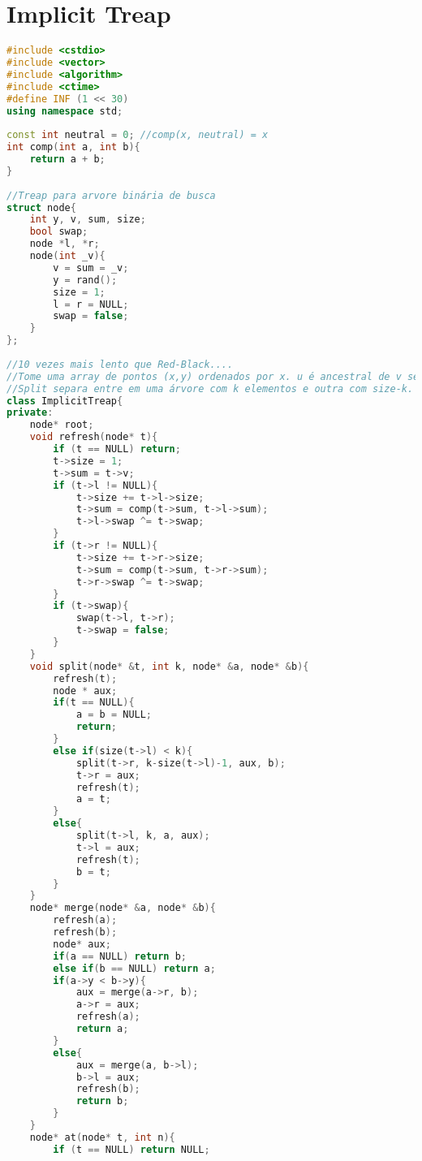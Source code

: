 \documentclass[12pt,a4paper,twoside]{report}
\begin{document}
\section{Implicit Treap}
\noindent\begin{lstlisting}[caption=Implicit Treap,language=C++]
#include <cstdio>
#include <vector>
#include <algorithm>
#include <ctime>
#define INF (1 << 30)
using namespace std;
 
const int neutral = 0; //comp(x, neutral) = x
int comp(int a, int b){
    return a + b;
}
 
//Treap para arvore binária de busca
struct node{
    int y, v, sum, size;
    bool swap;
    node *l, *r;
    node(int _v){
        v = sum = _v;
        y = rand();
        size = 1;
        l = r = NULL;
        swap = false;
    }  
};
 
//10 vezes mais lento que Red-Black....
//Tome uma array de pontos (x,y) ordenados por x. u é ancestral de v se e somente se y(u) é maior que todos os elementos de u a v, v incluso!
//Split separa entre em uma árvore com k elementos e outra com size-k.
class ImplicitTreap{
private:
    node* root;
    void refresh(node* t){
        if (t == NULL) return;
        t->size = 1;
        t->sum = t->v;
        if (t->l != NULL){
            t->size += t->l->size;
            t->sum = comp(t->sum, t->l->sum);
            t->l->swap ^= t->swap;
        }
        if (t->r != NULL){
            t->size += t->r->size;
            t->sum = comp(t->sum, t->r->sum);
            t->r->swap ^= t->swap;
        }
        if (t->swap){
            swap(t->l, t->r);
            t->swap = false;
        }
    }
    void split(node* &t, int k, node* &a, node* &b){
        refresh(t);
        node * aux;
        if(t == NULL){
            a = b = NULL;
            return;
        }
        else if(size(t->l) < k){
            split(t->r, k-size(t->l)-1, aux, b);
            t->r = aux;
            refresh(t);
            a = t;
        }
        else{
            split(t->l, k, a, aux);
            t->l = aux;
            refresh(t);
            b = t;
        }
    }
    node* merge(node* &a, node* &b){
        refresh(a);
        refresh(b);
        node* aux;
        if(a == NULL) return b;
        else if(b == NULL) return a;
        if(a->y < b->y){
            aux = merge(a->r, b);
            a->r = aux;
            refresh(a);
            return a;
        }
        else{
            aux = merge(a, b->l);
            b->l = aux;
            refresh(b);
            return b;
        }
    }
    node* at(node* t, int n){
        if (t == NULL) return NULL;

\end{lstlisting}
\end{document}
